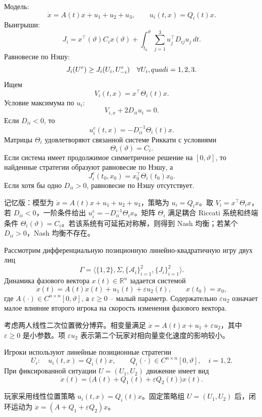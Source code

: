 \documentclass[12pt,a4paper]{article}
\newcommand{\R}{\mathbb{R}}
\newcommand{\memory}{}
\newcommand{\zh}[1]{\par\noindent #1\par}
\begin{document}
\memory
Модель:
\[
\dot x=A(t)x+u_1+u_2+u_3,
\qquad u_i(t,x)=Q_i(t)x.
\]
Выигрыши:
\[
J_i=x^{\top}(\vartheta)C_ix(\vartheta)+\int_{t_0}^{\vartheta}\sum_{j=1}^3u_j^{\top}D_{ij}u_j\,dt.
\]
Равновесие по Нэшу:
\[
J_i(U^e)\ge J_i(U_i,U_{-i}^e)\quad \forall U_i,\\quad i=1,2,3.
\]
Ищем
\[
V_i(t,x)=x^{\top}\Theta_i(t)x.
\]
Условие максимума по \(u_i\):
\[
V_{i,x}+2D_{ii}u_i=0.
\]
Если \(D_{ii}<0\), то
\[
u_i^e(t,x)=-D_{ii}^{-1}\Theta_i(t)x.
\]
Матрицы \(\Theta_i\) удовлетворяют связанной системе Риккати с условиями
\[
\Theta_i(\vartheta)=C_i.
\]
Если система имеет продолжимое симметричное решение на \([0,\vartheta]\), то найденные стратегии образуют равновесие по Нэшу, а
\[
J_i^e(t_0,x_0)=x_0^{\top}\Theta_i(t_0)x_0.
\]
Если хотя бы одно \(D_{ii}>0\), равновесие по Нэшу отсутствует.
\zh{记忆版：模型为 \(\dot x=A(t)x+u_1+u_2+u_3\)，策略为 \(u_i=Q_i x\)。取 \(V_i=x^\top\Theta_i x\)，若 \(D_{ii}<0\)，一阶条件给出 \(u_i^e=-D_{ii}^{-1}\Theta_i x\)。矩阵 \(\Theta_i\) 满足耦合 Riccati 系统和终端条件 \(\Theta_i(\vartheta)=C_i\)。若该系统有可延拓对称解，则得到 Nash 均衡；若某个 \(D_{ii}>0\)，Nash 均衡不存在。}

\newpage
{}


Рассмотрим дифференциальную позиционную линейно-квадратичную игру двух лиц
\[
\Gamma=\langle \{1,2\},\Sigma,\{\mathcal A_i\}_{i=1}^2,\{J_i\}_{i=1}^2\rangle .
\]
Динамика фазового вектора \(x(t)\in\R^n\) задается системой
\[
\dot x(t)=A(t)x(t)+u_1(t)+\varepsilon u_2(t),
\qquad x(t_0)=x_0,
\]
где \(A(\cdot)\in C^{n\times n}[0,\vartheta]\), а \(\varepsilon\ge 0\) -- малый параметр. Содержательно \(\varepsilon u_2\) означает малое влияние второго игрока на скорость изменения фазового вектора.
\zh{考虑两人线性二次位置微分博弈。相变量满足 \(\dot x=A(t)x+u_1+\varepsilon u_2\)，其中 \(\varepsilon\ge0\) 是小参数。项 \(\varepsilon u_2\) 表示第二个玩家对相向量变化速度的影响较小。}

Игроки используют линейные позиционные стратегии
\[
U_i:\quad u_i(t,x)=Q_i(t)x,
\qquad Q_i(\cdot)\in C^{n\times n}[0,\vartheta],
\quad i=1,2.
\]
При фиксированной ситуации \(U=(U_1,U_2)\) движение имеет вид
\[
\dot x(t)=\bigl(A(t)+Q_1(t)+\varepsilon Q_2(t)\bigr)x(t).
\]
\zh{玩家采用线性位置策略 \(u_i(t,x)=Q_i(t)x\)。固定策略组 \(U=(U_1,U_2)\) 后，闭环运动为 \(\dot x=(A+Q_1+\varepsilon Q_2)x\)。}
\end{document}
